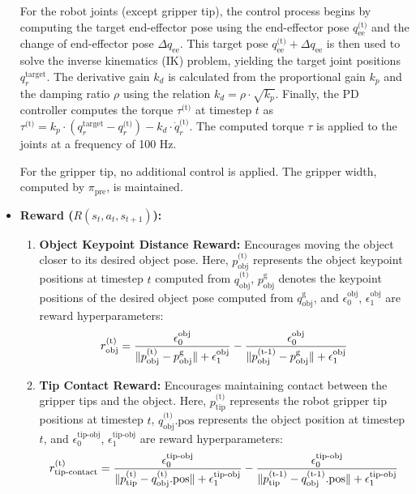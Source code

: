 \begin{itemize}
    For the robot joints (except gripper tip), the control process begins by computing the target end-effector pose using the end-effector pose $q^\text{(t)}_\text{ee}$ and the change of end-effector pose \( \Delta q_\text{ee} \). This target pose $q^\text{(t)}_\text{ee} + \Delta q_\text{ee}$ is then used to solve the inverse kinematics (IK) problem, yielding the target joint positions \( q_r^\text{target} \). The derivative gain \( k_d \) is calculated from the proportional gain \( k_p \) and the damping ratio \( \rho \) using the relation \( k_d = \rho \cdot \sqrt{k_p} \). Finally, the PD controller computes the torque $\tau^\text{(t)}$ at timestep $t$ as \( \tau^\text{(t)} = k_p \cdot (q_r^\text{target} - q^\text{(t)}_r) - k_d \cdot \dot{q}^\text{(t)}_r \). The computed torque $\tau$ is applied to the joints at a frequency of 100 Hz.

    For the gripper tip, no additional control is applied. The gripper width, computed by \( \pi_\text{pre} \), is maintained.

    \medskip
    \item \textbf{Reward (\( R(s_t, a_t, s_{t+1}) \)):}
    \begin{enumerate}
        \item \textbf{Object Keypoint Distance Reward:} Encourages moving the object closer to its desired object pose. Here, $p_\text{obj}^\text{(t)}$ %
        represents the object keypoint positions at timestep $t$ computed from $q^\text{(t)}_\text{obj}$, $p^\text{g}_\text{obj}$ %
        denotes the keypoint positions of the desired object pose computed from $q^\text{g}_\text{obj}$, and $\epsilon^{\text{obj}}_0$, $\epsilon^{\text{obj}}_1$ are reward hyperparameters:
        \[
        \begin{aligned}
        r^\text{(t)}_{\text{obj}} = {\epsilon_0^{\text{obj}}\over{\|p^\text{(t)}_\text{obj} - p^\text{g}_\text{obj}\| + \epsilon^{\text{obj}}_1}}
        - {\epsilon_0^{\text{obj}}\over{\|p^\text{(t-1)}_\text{obj} - p^\text{g}_\text{obj}\| + \epsilon^{\text{obj}}_1}}
        \end{aligned}
        \]
    
        \item \textbf{Tip Contact Reward:} Encourages maintaining contact between the gripper tips and the object. Here, $p^\text{(t)}_\text{tip}$ represents the robot gripper tip positions at timestep $t$, $q^\text{(t)}_\text{obj}.\text{pos}$ represents the object position at timestep $t$, and $\epsilon^{\text{tip-obj}}_0$, $\epsilon^{\text{tip-obj}}_1$ are reward hyperparameters:
        \[
        \begin{aligned}
        r^\text{(t)}_{\text{tip-contact}} = {\epsilon_0^{\text{tip-obj}}\over{\|p_\text{tip}^\text{(t)} - q^\text{(t)}_\text{obj}.\text{pos}\| + \epsilon^{\text{tip-obj}}_1}}
        - {\epsilon_0^{\text{tip-obj}}\over{\|p^\text{(t-1)}_\text{tip} - q^\text{(t-1)}_\text{obj}.\text{pos}\| + \epsilon^{\text{tip-obj}}_1}}
        \end{aligned}
        \]
    

\end{enumerate}
\end{itemize}
